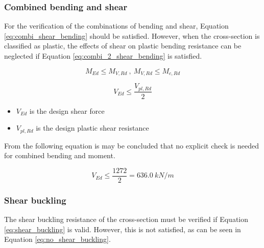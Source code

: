 

\subsubsection{Combined bending and shear}

For the verification of the combinations of bending and shear, Equation \ref{eq:combi_shear_bending} should be satisfied. However, when the cross-section is classified as plastic, the effects of shear on plastic bending resistance can be neglected if Equation \ref{eq:combi_2_shear_bending} is satisfied. 

\begin{equation}
    M_{Ed} \leq M_{V,Rd} \ , \ M_{V,Rd} \leq M_{c,Rd}
    \label{eq:combi_shear_bending}
\end{equation}

\begin{equation}
    V_{Ed} \leq \frac{V_{pl,Rd}}{2}
    \label{eq:combi_2_shear_bending}
\end{equation}

\begin{itemize}
  \item $V_{Ed}$ is the design shear force
  \item $V_{pl,Rd}$ is the design plastic shear resistance
\end{itemize}

From the following equation is may be concluded that no explicit check is needed for combined bending and moment. 

\begin{equation}
    V_{Ed} \leq \frac{1272}{2} = 636.0 \ kN/m 
\end{equation}

\subsubsection{Shear buckling}

The shear buckling resistance of the cross-section must be verified if Equation \ref{eq:shear_buckling} is valid. However, this is not satisfied, as can be seen in Equation \ref{eq:no_shear_buckling}.

